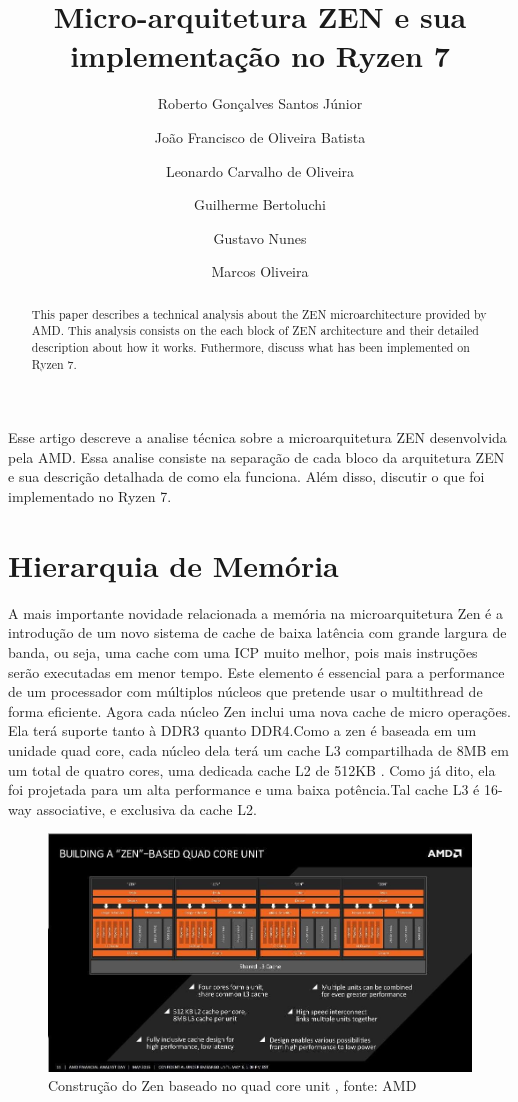 \documentclass[12pt]{article}
\title{Micro-arquitetura ZEN e sua implementação no Ryzen 7}
\author{Roberto Gonçalves Santos Júnior \and João Francisco de Oliveira Batista 
\and Leonardo Carvalho de Oliveira \and Guilherme Bertoluchi \and Gustavo Nunes \and Marcos Oliveira}
\begin{document}
 

\maketitle
\thispagestyle{empty}
\newpage

\tableofcontents
\thispagestyle{empty}
\newpage

\begin{abstract}
  This paper describes a technical analysis about the ZEN microarchitecture provided by AMD. This analysis consists on the each block of ZEN architecture and their detailed description about how it works. Futhermore, discuss what has been implemented on Ryzen 7.
\end{abstract}

\begin{resumo}
  Esse artigo descreve a analise técnica sobre a microarquitetura ZEN desenvolvida pela AMD. Essa analise consiste na separação de cada bloco da arquitetura ZEN e sua descrição detalhada de como ela funciona. Além disso, discutir o que foi implementado no Ryzen 7. 
\end{resumo}

\thispagestyle{empty}
\newpage

\section{Hierarquia de Memória}
A mais importante novidade relacionada a memória na microarquitetura Zen é a introdução de um novo sistema de cache de baixa latência com grande largura de banda, ou seja, uma cache com uma ICP muito melhor, pois mais instruções serão executadas em menor tempo. Este elemento é essencial para a performance de um processador com múltiplos núcleos que pretende usar o multithread de forma eficiente.
Agora cada núcleo Zen inclui uma nova cache de micro operações.
Ela terá suporte tanto à DDR3 quanto DDR4.Como a zen é baseada em um unidade quad core, cada núcleo dela terá um cache L3 compartilhada de 8MB em um total de quatro cores, uma dedicada cache L2 de 512KB . Como já dito, ela foi projetada para um alta performance e uma baixa potência.Tal cache L3 é 16-way associative, e exclusiva da cache L2.

\begin{figure}[h!]
\centering
\includegraphics[width=120mm,scale=0.8]{amd.jpg}
\caption{Construção do Zen baseado no quad core unit , fonte: AMD}
\label{fig:amd}
\end{figure}
\end{document}
